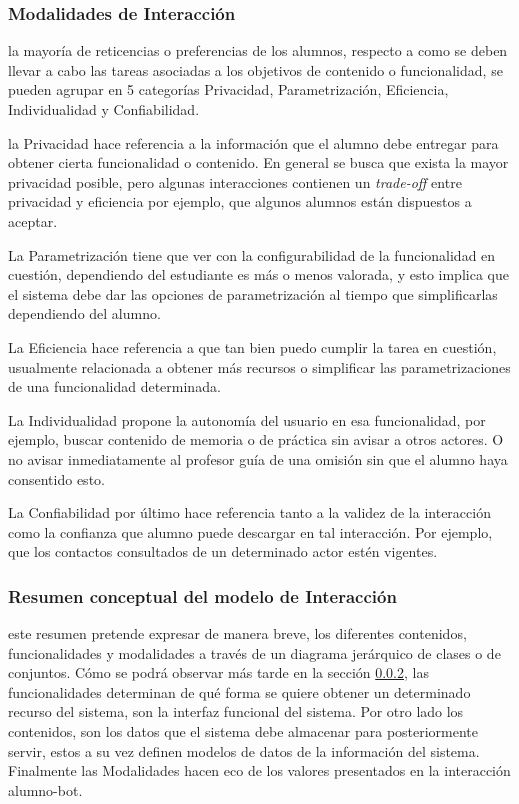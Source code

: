     \subsubsection{Modalidades de Interacción}
    \label{sssec:cualidades}
    \par la mayoría de reticencias o preferencias de los alumnos, respecto a como se deben llevar a cabo las tareas asociadas a los objetivos de contenido o funcionalidad, se pueden agrupar en 5 categorías Privacidad, Parametrización, Eficiencia, Individualidad y Confiabilidad.
    \par la Privacidad hace referencia a la información que el alumno debe entregar para obtener cierta funcionalidad o contenido. En general se busca que exista la mayor privacidad posible, pero algunas interacciones contienen un \textit{trade-off} entre privacidad y eficiencia por ejemplo, que algunos alumnos están dispuestos a aceptar.
    \par La Parametrización tiene que ver con la configurabilidad de la funcionalidad en cuestión, dependiendo del estudiante es más o menos valorada, y esto implica que el sistema debe dar las opciones de parametrización al tiempo que simplificarlas dependiendo del alumno.
    \par La Eficiencia hace referencia a que tan bien puedo cumplir la tarea en cuestión, usualmente relacionada a obtener más recursos o simplificar las parametrizaciones de una funcionalidad determinada.
    \par La Individualidad propone la autonomía del usuario en esa funcionalidad, por ejemplo, buscar contenido de memoria o de práctica sin avisar a otros actores. O no avisar inmediatamente al profesor guía de una omisión sin que el alumno haya consentido esto.
    \par La Confiabilidad por último hace referencia tanto a la validez de la interacción como la confianza que alumno puede descargar en tal interacción. Por ejemplo, que los contactos consultados de un determinado actor estén vigentes.
    
    \subsubsection{Resumen conceptual del modelo de Interacción}

    \par este resumen pretende expresar de manera breve, los diferentes contenidos, funcionalidades y modalidades a través de un diagrama jerárquico de clases o de conjuntos. Cómo se podrá observar más tarde en la sección \ref{}, las funcionalidades determinan de qué forma se quiere obtener un determinado recurso del sistema, son la interfaz funcional del sistema. Por otro lado los contenidos, son los datos que el sistema debe almacenar para posteriormente servir, estos a su vez definen modelos de datos de la información del sistema. Finalmente las Modalidades hacen eco de los valores presentados en la interacción alumno-bot.
    
